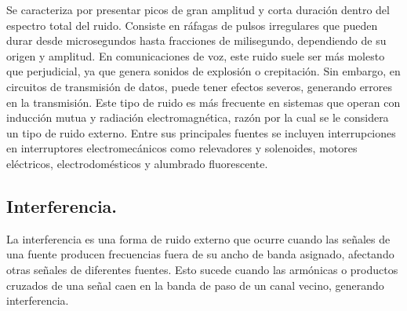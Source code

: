 \begin{justify}
    Se caracteriza por presentar picos de gran amplitud y corta duración dentro del espectro total del ruido. Consiste en ráfagas de pulsos irregulares
    que pueden durar desde microsegundos hasta fracciones de milisegundo, dependiendo de su origen y amplitud. En comunicaciones de voz, este ruido suele ser más
    molesto que perjudicial, ya que genera sonidos de explosión o crepitación. Sin embargo, en circuitos de transmisión de datos, puede tener efectos severos,
    generando errores en la transmisión. Este tipo de ruido es más frecuente en sistemas que operan con inducción mutua y radiación electromagnética,
    razón por la cual se le considera un tipo de ruido externo. Entre sus principales fuentes se incluyen interrupciones en interruptores electromecánicos
    como relevadores y solenoides, motores eléctricos, electrodomésticos y alumbrado fluorescente.
\end{justify}

\subsection*{\fontsize{12}{18}\selectfont Interferencia.}

\begin{justify}
    La interferencia es una forma de ruido externo que ocurre cuando las señales de una fuente producen frecuencias fuera de su ancho de banda asignado,
    afectando otras señales de diferentes fuentes. Esto sucede cuando las armónicas o productos cruzados de una señal caen en la banda de paso de un canal vecino,
    generando interferencia.
\end{justify}